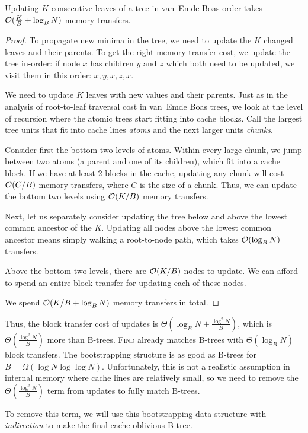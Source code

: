 \begin{theorem}
Updating $K$ consecutive leaves of a tree in van~Emde Boas order takes
$\mathcal{O}(\frac{K}{B}+\log_B N)$ memory transfers.
\end{theorem}
\begin{proof}
To propagate new minima in the tree, we need to update the $K$ changed leaves
and their parents. To get the right memory transfer cost, we update the tree
in-order: if node $x$ has children $y$ and $z$ which both need to be updated,
we visit them in this order: $x,y,x,z,x$.

We need to update $K$ leaves with new values and their parents.
Just as in the analysis of root-to-leaf traversal cost in van~Emde Boas trees,
we look at the level of recursion where the atomic trees start fitting into
cache blocks.
Call the largest tree units that fit into cache lines \emph{atoms} and the next
larger units \emph{chunks}.

Consider first the bottom two levels of atoms. Within every large chunk,
we jump between two atoms (a parent and one of its children), which fit into
a cache block. If we have at least 2 blocks in the cache, updating any chunk
will cost $\mathcal{O}(C/B)$ memory transfers, where $C$ is the size of a chunk.
Thus, we can update the bottom two levels using $\mathcal{O}(K/B)$ memory transfers.

Next, let us separately consider updating the tree below and above the lowest
common ancestor of the $K$. Updating all nodes above the lowest common ancestor
means simply walking a root-to-node path, which takes $\mathcal{O}(\log_B N)$ transfers.

Above the bottom two levels, there are $\mathcal{O}(K/B)$ nodes to update. We can afford
to spend an entire block transfer for updating each of these nodes.

We spend $\mathcal{O}(K/B + \log_B N)$ memory transfers in total.
\end{proof}

Thus, the block transfer cost of updates is $\Theta(\log_B N+\frac{\log^2
N}{B})$, which is $\Theta(\frac{\log^2 N}{B})$ more than B-trees.
\textsc{Find} already matches B-trees with $\Theta(\log_B N)$ block transfers.
The bootstrapping structure is as good as B-trees for
$B=\Omega(\log N\log\log N)$.  Unfortunately, this is not a realistic
assumption in internal memory where cache lines are relatively small, so we
need to remove the $\Theta(\frac{\log^2 N}{B})$ term from updates to fully
match B-trees.

To remove this term, we will use this bootstrapping data structure with
\emph{indirection} to make the final cache-oblivious B-tree.

